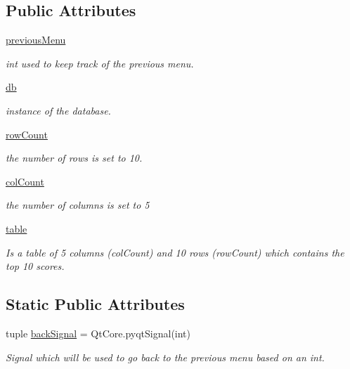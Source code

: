 \subsection*{Public Attributes}
\begin{DoxyCompactItemize}
\item 
\hyperlink{classsrc_1_1leaderboard_1_1_leaderboard_abca7271f8092bb5672bf66c04971e04e}{previous\+Menu}
\begin{DoxyCompactList}\small\item\em int used to keep track of the previous menu. \end{DoxyCompactList}\item 
\hyperlink{classsrc_1_1leaderboard_1_1_leaderboard_aa059323abc817556528ae54dd5dbca6b}{db}
\begin{DoxyCompactList}\small\item\em instance of the database. \end{DoxyCompactList}\item 
\hyperlink{classsrc_1_1leaderboard_1_1_leaderboard_a48b819acfb54637e30e709361ed32a85}{row\+Count}
\begin{DoxyCompactList}\small\item\em the number of rows is set to 10. \end{DoxyCompactList}\item 
\hypertarget{classsrc_1_1leaderboard_1_1_leaderboard_ac02b975859a4e3cb57eabe5206808a46}{}\hyperlink{classsrc_1_1leaderboard_1_1_leaderboard_ac02b975859a4e3cb57eabe5206808a46}{col\+Count}\label{classsrc_1_1leaderboard_1_1_leaderboard_ac02b975859a4e3cb57eabe5206808a46}

\begin{DoxyCompactList}\small\item\em the number of columns is set to 5 \end{DoxyCompactList}\item 
\hyperlink{classsrc_1_1leaderboard_1_1_leaderboard_a1d9b33cb94b8636038320f10d3d2fe30}{table}
\begin{DoxyCompactList}\small\item\em Is a table of 5 columns (col\+Count) and 10 rows (row\+Count) which contains the top 10 scores. \end{DoxyCompactList}\end{DoxyCompactItemize}
\subsection*{Static Public Attributes}
\begin{DoxyCompactItemize}
\item 
tuple \hyperlink{classsrc_1_1leaderboard_1_1_leaderboard_a8c170d23c0124efb4c1d885720c926af}{back\+Signal} = Qt\+Core.\+pyqt\+Signal(int)
\begin{DoxyCompactList}\small\item\em Signal which will be used to go back to the previous menu based on an int. \end{DoxyCompactList}\end{DoxyCompactItemize}


